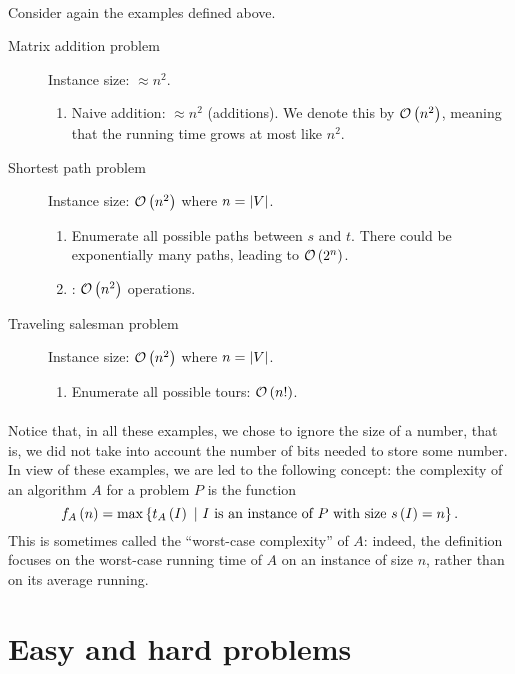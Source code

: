 \paragraph{}
Consider again the examples defined above.
\begin{description}
 \item[Matrix addition problem] Instance size: $\approx n^2$.
 \begin{enumerate}
  \item Naive addition: $\approx n^2$ (additions). We denote this by $\mathcal{O}\left( n^2 \right)$, meaning that the running time grows at most like $n^2$.
 \end{enumerate}
 \item[Shortest path problem] Instance size: $\mathcal{O}\left( n^2 \right)$ where $n=\left| V \right|$.
 \begin{enumerate}
  \item Enumerate all possible paths between $s$ and $t$. There could be exponentially many paths, leading to $\mathcal{O}\left( 2^n \right)$.
  \item {}: $\mathcal{O}\left( n^2 \right)$ operations.
 \end{enumerate}
 \item[Traveling salesman problem] Instance size: $\mathcal{O}\left( n^2 \right)$ where $n=\left| V \right|$.
 \begin{enumerate}
  \item Enumerate all possible tours: $\mathcal{O}\left( n! \right)$.
 \end{enumerate}
\end{description}

\paragraph{}
Notice that, in all these examples, we chose to ignore the size of a number, that is, we did not take into account the number of bits needed to store some number. In view of these examples, we are led to the following concept: the complexity of an algorithm $A$ for a problem $P$ is the function 
\begin{equation}
f_A\left( n \right)=\max\left\{ t_A\left( I \right)\ |\ \mbox{$I$ is an instance of $P$ with size $s\left( I \right)=n$} \right\}.
\end{equation}
This is sometimes called the ``worst-case complexity'' of $A$: indeed, the definition focuses on the worst-case running time of $A$ on an instance of size $n$, rather than on its average running.

\section{Easy and hard problems}

